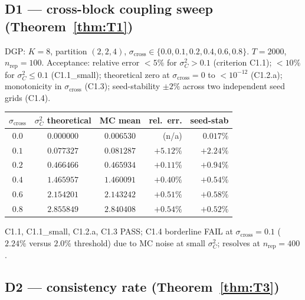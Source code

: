 \documentclass[11pt,letterpaper]{article}
\theoremstyle{remark}
\newcommand{\sigC}{\sigma^2_C}
\begin{document}
\subsection{D1 --- cross-block coupling sweep (Theorem~\ref{thm:T1})}

DGP: $K = 8$, partition $(2, 2, 4)$, $\sigma_{\mathrm{cross}} \in \{0.0, 0.1, 0.2, 0.4, 0.6, 0.8\}$. $T = 2000$, $n_{\mathrm{rep}} = 100$. Acceptance: relative error $< 5\%$ for $\sigC > 0.1$ (criterion C1.1); $< 10\%$ for $\sigC \le 0.1$ (C1.1\_small); theoretical zero at $\sigma_{\mathrm{cross}} = 0$ to $< 10^{-12}$ (C1.2.a); monotonicity in $\sigma_{\mathrm{cross}}$ (C1.3); seed-stability $\pm 2\%$ across two independent seed grids (C1.4).
\begin{center}
\begin{tabular}{cccrr}
\toprule
$\sigma_{\mathrm{cross}}$ & $\sigC$ theoretical & MC mean & rel.\ err. & seed-stab \\
\midrule
$0.0$ & $0.000000$ & $0.006530$ & (n/a) & $0.017\%$ \\
$0.1$ & $0.077327$ & $0.081287$ & $+5.12\%$ & $+2.24\%$ \\
$0.2$ & $0.466466$ & $0.465934$ & $+0.11\%$ & $+0.94\%$ \\
$0.4$ & $1.465957$ & $1.460091$ & $+0.40\%$ & $+0.54\%$ \\
$0.6$ & $2.154201$ & $2.143242$ & $+0.51\%$ & $+0.58\%$ \\
$0.8$ & $2.855849$ & $2.840408$ & $+0.54\%$ & $+0.52\%$ \\
\bottomrule
\end{tabular}
\end{center}
C1.1, C1.1\_small, C1.2.a, C1.3 PASS; C1.4 borderline FAIL at $\sigma_{\mathrm{cross}} = 0.1$ ($2.24\%$ versus $2.0\%$ threshold) due to MC noise at small $\sigC$; resolves at $n_{\mathrm{rep}} = 400$.

\subsection{D2 --- consistency rate (Theorem~\ref{thm:T3})}
\end{document}
